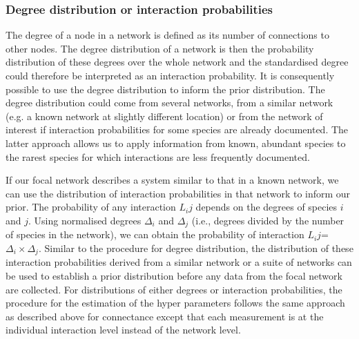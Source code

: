 \documentclass[12pt]{article}
\begin{document}


      \subsubsection*{Degree distribution or interaction probabilities}

          The degree of a node in a network is defined as its number of connections to other nodes. The degree distribution of a network is then the probability distribution of these degrees over the whole network and the standardised degree could therefore be interpreted as an interaction probability. It is consequently possible to use the degree distribution to inform the prior distribution. The degree distribution could come from several networks, from a similar network (e.g. a known network at slightly different location) or from the network of interest if interaction probabilities for some species are already documented. The latter approach allows us to apply information from known, abundant species to the rarest species for which interactions are less frequently documented. 


          If our focal network describes a system similar to that in a known network, we can use the distribution of interaction probabilities in that network to inform our prior. The probability of any interaction $L_ij$ depends on the degrees of species $i$ and $j$. Using normalised degrees $\Delta_i$ and $\Delta_j$ (i.e., degrees divided by the number of species in the network), we can obtain the probability of interaction $L_ij$=$\Delta_i\times\Delta_j$. Similar to the procedure for degree distribution, the distribution of these interaction probabilities derived from a similar network or a suite of networks can be used to establish a prior distribution before any data from the focal network are collected. For distributions of either degrees or interaction probabilities, the procedure for the estimation of the hyper parameters follows the same approach as described above for connectance except that each measurement is at the individual interaction level instead of the network level.
\end{document}
